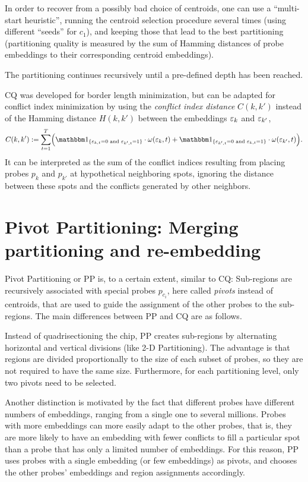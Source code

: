 In order to recover from a possibly bad choice of centroids, one can
use a ``multi-start heuristic'', running the centroid selection
procedure several times (using different ``seeds'' for $c_1$), and
keeping those that lead to the best partitioning (partitioning quality
is measured by the sum of Hamming distances of probe embeddings to
their corresponding centroid embeddings).

The partitioning continues recursively until a pre-defined depth has been
reached.

CQ was developed for border length minimization, but can be adapted
for conflict index minimization by using the \emph{conflict index
  distance} $C(k,k')$ instead of the Hamming distance $H(k,k')$
between the embeddings $\varepsilon_k$ and $\varepsilon_{k'}$,
\begin{equation}
\label{eq:ci_dist}
C(k,k') := \sum_{t=1}^{T}
  \Bigl(
    \Ind{\eps_{k,t}=0 \text{ and } \eps_{k',t}=1}
    \cdot \omega(\eps_{k},t)
    +
    \Ind{\eps_{k',t}=0 \text{ and } \eps_{k,t}=1}
    \cdot \omega(\eps_{k'},t)
  \Bigr).
\end{equation}
It can be interpreted as the sum of the conflict indices resulting
from placing probes $p_k$ and $p_{k'}$ at hypothetical neighboring
spots, ignoring the distance between these spots and the conflicts
generated by other neighbors.


\section{Pivot Partitioning: Merging partitioning and re-embedding}
\label{sec:part_pp}

Pivot Partitioning or PP \citep{Carvalho2006} is, to a certain extent,
similar to CQ: Sub-regions are recursively associated with special
probes $p_{c_i}$, here called \emph{pivots} instead of centroids, that
are used to guide the assignment of the other probes to the
sub-regions.  The main differences between PP and CQ are as follows.

Instead of quadrisectioning the chip, PP creates sub-regions by
alternating horizontal and vertical divisions (like 2-D Partitioning).
The advantage is that regions are divided proportionally to the size
of each subset of probes, so they are not required to have the same
size. Furthermore, for each partitioning level, only two pivots need
to be selected.

Another distinction is motivated by the fact that different probes
have different numbers of embeddings, ranging from a single one to
several millions.  Probes with more embeddings can more easily adapt
to the other probes, that is, they are more likely to have an
embedding with fewer conflicts to fill a particular spot than a probe
that has only a limited number of embeddings. For this reason, PP uses
probes with a single embedding (or few embeddings) as pivots, and
chooses the other probes' embeddings and region assignments accordingly.

